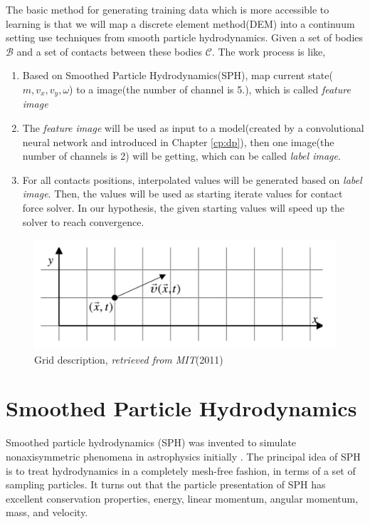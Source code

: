     The basic method for generating training data which is more accessible to learning is that we will map a discrete element method(DEM) into a continuum setting use techniques from smooth particle hydrodynamics. Given a set of bodies $\mathcal{B}$ and a set of contacts between these bodies $\mathcal{C}$. The work process is like,
    \begin{enumerate}
        \item Based on Smoothed Particle Hydrodynamics(SPH), map current state($m, v_x, v_y, \omega$) to a image(the number of channel is 5.), which is called \textit{feature image}
        \item The \textit{feature image} will be used as input to a model(created by a convolutional neural network and introduced in Chapter \ref{cp:dp}), then one image(the number of channels is 2) will be getting, which can be called \textit{label image}.
        \item For all contacts positions, interpolated values will be generated based on \textit{label image}. Then, the values will be used as starting iterate values for contact force solver. In our hypothesis, the given starting values will speed up the solver to reach convergence.
    \end{enumerate}

    \begin{figure}
        \centering
        \includegraphics[scale = 0.4]{Figures/grid_method.png}
        \caption{Grid description, \textit{retrieved from MIT}(2011)}
    \end{figure}

\section{Smoothed Particle Hydrodynamics}
    Smoothed particle hydrodynamics (SPH) was invented to simulate nonaxisymmetric phenomena in astrophysics initially \cite{DBLP:journals/corr/GuWKMSSLWW15}. The principal idea of SPH is to treat hydrodynamics in a completely mesh-free fashion, in terms of a set of sampling particles. It turns out that the particle presentation of SPH has excellent conservation properties, energy, linear momentum, angular momentum, mass, and velocity.

